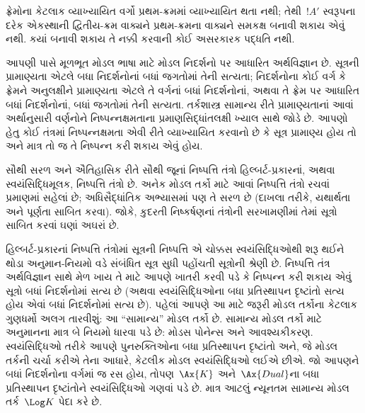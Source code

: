 ફ્રેમોના કેટલાક વ્યાખ્યાયિત વર્ગો પ્રથમ-ક્રમમાં
વ્યાખ્યાયિત થતા નથી; તેથી~$!A'$ સ્વરૂપના દરેક
એકસ્થાની દ્વિતીય-ક્રમ વાક્યને પ્રથમ-ક્રમના
વાક્યને સમકક્ષ બનાવી શકાય એવું નથી.
કયાં બનાવી શકાય તે નક્કી કરવાની કોઈ અસરકારક
પદ્ધતિ નથી.
\endgroup


\OLEndChapterHook
\endgroup


\begingroup
\makeatletter{}\makeatother

\label{guunit:OLP-0427}


\begingroup
\makeatletter{}\makeatother


\label{guunit:OLP-0428}


આપણી પાસે મૂળભૂત મોડલ ભાષા માટે મોડલ નિદર્શનો પર આધારિત અર્થવિજ્ઞાન છે.
સૂત્રની પ્રામાણ્યતા એટલે બધા નિદર્શનોનાં બધાં જગતોમાં તેની સત્યતા;
નિદર્શનોના કોઈ વર્ગ કે ફ્રેમને અનુલક્ષીને પ્રામાણ્યતા એટલે તે વર્ગનાં બધાં
નિદર્શનોનાં, અથવા તે ફ્રેમ પર આધારિત બધાં નિદર્શનોનાં, બધાં જગતોમાં તેની
સત્યતા. તર્કશાસ્ત્ર સામાન્ય રીતે પ્રામાણ્યતાનાં આવાં અર્થાનુસારી વર્ણનોને
નિષ્પન્નક્ષમતાના પ્રમાણસિદ્ધાંતલક્ષી ખ્યાલ સાથે જોડે છે. આપણો હેતુ
કોઈ તંત્રમાં નિષ્પન્નક્ષમતા એવી રીતે વ્યાખ્યાયિત કરવાનો છે કે સૂત્ર
પ્રામાણ્ય હોય તો અને માત્ર તો જ તે નિષ્પન્ન કરી શકાય એવું હોય.

સૌથી સરળ અને ઐતિહાસિક રીતે સૌથી જૂનાં નિષ્પત્તિ તંત્રો હિલ્બર્ટ-પ્રકારનાં,
અથવા સ્વયંસિદ્ધિમૂલક, નિષ્પત્તિ તંત્રો છે. અનેક મોડલ તર્કો માટે આવાં
નિષ્પત્તિ તંત્રો રચવાં પ્રમાણમાં સહેલાં છે; અધિસૈદ્ધાંતિક અભ્યાસમાં પણ તે સરળ છે
(દાખલા તરીકે, યથાર્થતા અને પૂર્ણતા સાબિત કરવા). જોકે, કુદરતી નિષ્કર્ષણનાં
તંત્રોની સરખામણીમાં તેમાં સૂત્રો સાબિત કરવાં ઘણાં અઘરાં છે.

હિલ્બર્ટ-પ્રકારનાં નિષ્પત્તિ તંત્રોમાં સૂત્રની નિષ્પત્તિ
એ ચોક્કસ સ્વયંસિદ્ધિઓથી શરૂ થઈને થોડા અનુમાન-નિયમો વડે સંબંધિત સૂત્ર
સુધી પહોંચતી સૂત્રોની શ્રેણી છે. નિષ્પત્તિ તંત્ર અર્થવિજ્ઞાન સાથે
મેળ ખાય તે માટે આપણે ખાતરી કરવી પડે કે નિષ્પન્ન કરી શકાય એવું સૂત્રો બધાં
નિદર્શનોમાં સત્ય છે (અથવા સ્વયંસિદ્ધિઓના બધા પ્રતિસ્થાપન
દૃષ્ટાંતો સત્ય હોય એવાં બધાં
નિદર્શનોમાં સત્ય છે). પહેલાં આપણે આ માટે જરૂરી મોડલ તર્કોના કેટલાક
ગુણધર્મો અલગ તારવીશું: આ ``સામાન્ય'' મોડલ તર્કો છે. સામાન્ય મોડલ તર્કો
માટે અનુમાનના માત્ર બે નિયમો ધારવા પડે છે: મોડસ પોનેન્સ અને આવશ્યકીકરણ.
સ્વયંસિદ્ધિઓ તરીકે આપણે પુનરુક્તિઓના બધા પ્રતિસ્થાપન દૃષ્ટાંતો અને,
જે મોડલ તર્કની ચર્ચા કરીએ તેના આધારે, કેટલીક મોડલ સ્વયંસિદ્ધિઓ લઈએ
છીએ. જો આપણને બધાં નિદર્શનોના વર્ગમાં જ રસ હોય, તોપણ~$\Ax{K}$ અને~$\Ax{Dual}$ના
બધા પ્રતિસ્થાપન દૃષ્ટાંતોને સ્વયંસિદ્ધિઓ ગણવાં પડે છે. માત્ર આટલું
ન્યૂનતમ સામાન્ય મોડલ તર્ક~$\Log K$ પેદા કરે છે.

